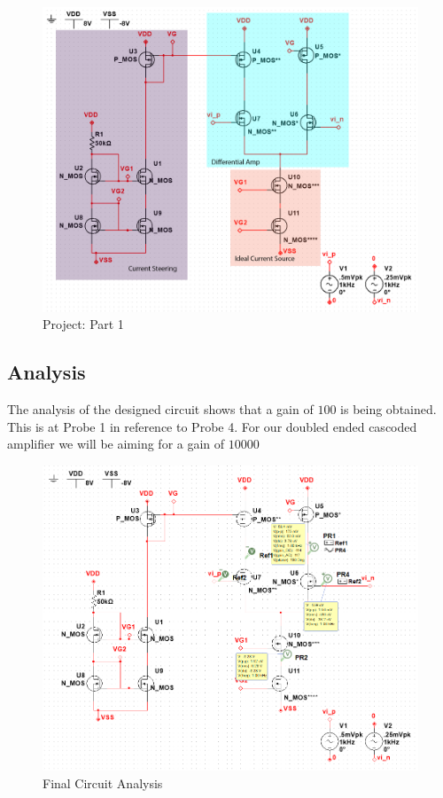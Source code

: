 \documentclass[12pt]{article}
\begin{document}
\begin{figure}[h!]
	\label{fig:amp}
	\caption{Project: Part 1}
	\centering
	\includegraphics[width=.6\textwidth]{photoshop}
\end{figure}



\subsection{Analysis}
The analysis of the designed circuit shows that a gain of $100$ is being obtained. This is at Probe 1 in reference to Probe 4. For our doubled ended cascoded amplifier we will be aiming for a gain of $10000$

\begin{figure}[h!]
	\label{fig:amp}
	\caption{Final Circuit Analysis}
	\centering
	\includegraphics[width=1\textwidth]{finalamp}
\end{figure}
\end{document}
